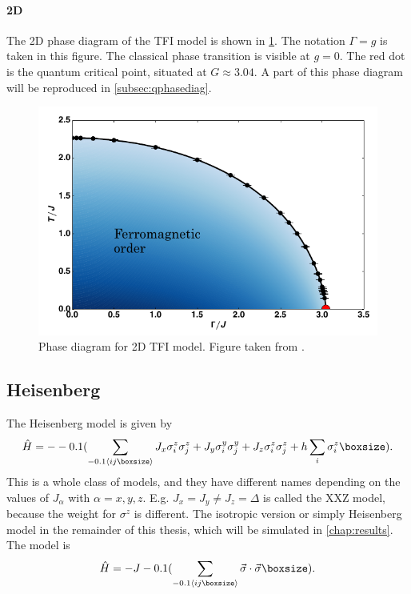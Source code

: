 \paragraph{2D}

The 2D phase diagram of the \Gls{TFI} model is shown in \cref{2dtisingphasediag}. The notation $\Gamma=g$ is taken in this figure. The classical phase transition is visible at $g=0$. The red dot is the quantum critical point, situated at $ G \approx 3.04  $. A part of this phase diagram will be reproduced in \cref{subsec:qphasediag}.

\begin{figure}[!htbp]
    \center
    \includegraphics[width=\textwidth]{Figuren/phsyics/2disingphase.png}
    \caption{Phase diagram for 2D \Gls{TFI} model. Figure taken from \cite{Hesselmann2016}.}
    \label{2dtisingphasediag}
\end{figure}

\subsection{Heisenberg}

The Heisenberg model is given by
\begin{equation}
    \hat{H} =  -\left( \sum_{\Braket{i j }} J_x \sigma^z_i \sigma^z_j + J_y \sigma^y_i \sigma^y_j+ J_z \sigma^z_i \sigma^z_j + h \sum_i \sigma^z_i \right ).
\end{equation}
This is a whole class of models, and they have different names depending on the values of $J_{\alpha} $ with $\alpha=x,y,z$. E.g. $J_x = J_y \neq J_z = \Delta$ is called the XXZ model, because the weight for $\sigma^z$ is different. The isotropic version or simply Heisenberg model in the remainder of this thesis, which will be simulated in \cref{chap:results}. The model is
\begin{equation}
    \hat{H} =  -J \left( \sum_{\Braket{i j }} \vec{\sigma} \cdot \vec{\sigma} \right ).
\end{equation}

